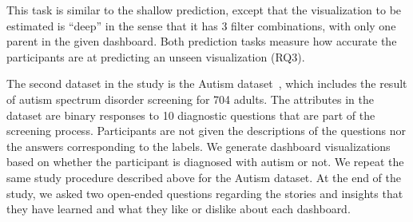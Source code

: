  This task is similar to the shallow prediction, except that the visualization to be estimated is ``deep'' in the sense that it has 3 filter combinations, with only one parent in the given dashboard. Both prediction tasks measure how accurate the participants are at predicting an unseen visualization (RQ3).

\par The second dataset in the study is the Autism dataset~\cite{autism}, which includes the result of autism spectrum disorder screening for 704 adults. The attributes in the dataset are  binary responses to 10 diagnostic questions that are part of the screening process. Participants are not given the descriptions of the questions nor the answers corresponding to the labels. We generate dashboard visualizations based on whether the participant is diagnosed with autism or not. We repeat the same study procedure described above for the Autism dataset. At the end of the study, we asked two open-ended questions regarding the stories and insights that they have learned and what they like or dislike about each dashboard.
